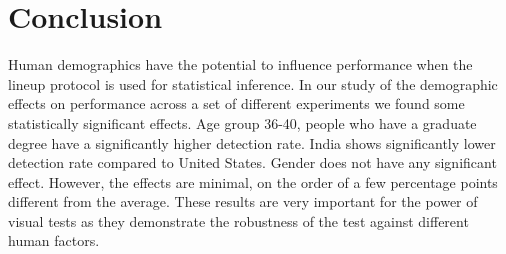\documentclass[10pt]{article}\usepackage[]{graphicx}\usepackage[]{xcolor}
\begin{document}
% 
% 
% 
% 
 

\section{Conclusion}

Human demographics have the potential to influence performance when the lineup protocol is used for statistical inference. In our study of the demographic effects on performance across a set of different experiments we found some statistically significant effects. Age group 36-40, people who have a graduate degree have a significantly higher detection rate. India shows significantly lower detection rate compared to United States. Gender does not have any significant effect. However, the effects are minimal, on the order of a few percentage points different from the average. These results are very important for the power of visual tests as they demonstrate the robustness of the test against different human factors.
\end{document}
